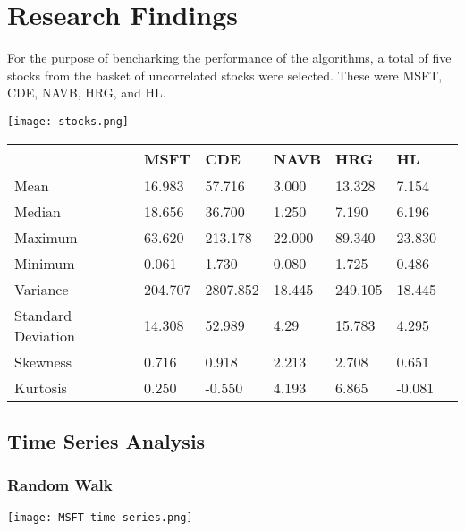 \chapter{Research Findings}
For the purpose of bencharking the performance of the algorithms, a total of five stocks from the basket of uncorrelated stocks were selected. These were MSFT, CDE, NAVB, HRG, and HL. 

\begin{center}
    \texttt{[image: stocks.png]}
    \label{fig:nonfloat}
\end{center}

\begin{center}
    \begin{tabular}{ | l | l | l | | l | l | l | p{5cm} |}
    \hline
     & MSFT & CDE & NAVB & HRG & HL \\ \hline
    Mean & 16.983 & 57.716 & 3.000 & 13.328 & 7.154 \\ \hline
    Median & 18.656 & 36.700 & 1.250 & 7.190 & 6.196 \\ \hline
    Maximum & 63.620 & 213.178 & 22.000 & 89.340 & 23.830 \\ \hline
    Minimum & 0.061 & 1.730 & 0.080 & 1.725 & 0.486 \\ \hline
    Variance & 204.707 & 2807.852 & 18.445 & 249.105 & 18.445 \\ \hline
    Standard Deviation & 14.308 & 52.989 & 4.29 & 15.783 & 4.295 \\ \hline
    Skewness & 0.716 & 0.918 & 2.213 & 2.708 & 0.651 \\ \hline
    Kurtosis & 0.250 & -0.550 & 4.193 & 6.865 & -0.081 \\ \hline
    \hline
    \end{tabular}
    \label{table:nonfloat}
\end{center}

\section{Time Series Analysis}

\subsection{Random Walk}

\begin{center}
    \texttt{[image: MSFT-time-series.png]}
    \label{fig:nonfloat}
\end{center}

